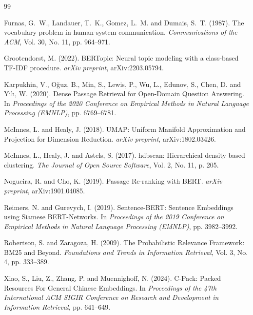 \documentclass[11pt,a4paper]{article}
\begin{document}
\begin{thebibliography}{99}

Furnas, G.~W., Landauer, T.~K., Gomez, L.~M. and Dumais, S.~T. (1987). The vocabulary problem in human-system communication. \textit{Communications of the ACM}, Vol. 30, No. 11, pp. 964--971.

Grootendorst, M. (2022). BERTopic: Neural topic modeling with a class-based TF-IDF procedure. \textit{arXiv preprint}, arXiv:2203.05794.

Karpukhin, V., O\u{g}uz, B., Min, S., Lewis, P., Wu, L., Edunov, S., Chen, D. and Yih, W. (2020). Dense Passage Retrieval for Open-Domain Question Answering. In \textit{Proceedings of the 2020 Conference on Empirical Methods in Natural Language Processing (EMNLP)}, pp. 6769--6781.

McInnes, L. and Healy, J. (2018). UMAP: Uniform Manifold Approximation and Projection for Dimension Reduction. \textit{arXiv preprint}, arXiv:1802.03426.

McInnes, L., Healy, J. and Astels, S. (2017). hdbscan: Hierarchical density based clustering. \textit{The Journal of Open Source Software}, Vol. 2, No. 11, p. 205.

Nogueira, R. and Cho, K. (2019). Passage Re-ranking with BERT. \textit{arXiv preprint}, arXiv:1901.04085.

Reimers, N. and Gurevych, I. (2019). Sentence-BERT: Sentence Embeddings using Siamese BERT-Networks. In \textit{Proceedings of the 2019 Conference on Empirical Methods in Natural Language Processing (EMNLP)}, pp. 3982--3992.

Robertson, S. and Zaragoza, H. (2009). The Probabilistic Relevance Framework: BM25 and Beyond. \textit{Foundations and Trends in Information Retrieval}, Vol. 3, No. 4, pp. 333--389.

Xiao, S., Liu, Z., Zhang, P. and Muennighoff, N. (2024). C-Pack: Packed Resources For General Chinese Embeddings. In \textit{Proceedings of the 47th International ACM SIGIR Conference on Research and Development in Information Retrieval}, pp. 641--649.

\end{thebibliography}
\end{document}
